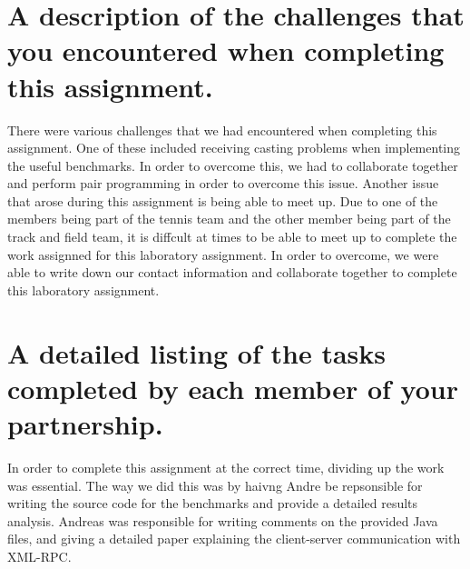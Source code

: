 \documentclass{article}
\begin{document}
\section{A description of the challenges that you encountered when completing this assignment.}

There were various challenges that we had encountered when completing this assignment. One of these included receiving casting problems when implementing the useful benchmarks. In order to overcome this, we had to collaborate together and perform pair programming in order to overcome this issue. Another issue that arose during this assignment is being able to meet up. Due to one of the members being part of the tennis team and the other member being part of the track and field team, it is diffcult at times to be able to meet up to complete the work assignned for this laboratory assignment. In order to overcome, we were able to write down our contact information and collaborate together to complete this laboratory assignment. 

\section{A detailed listing of the tasks completed by each member of your partnership.}
In order to complete this assignment at the correct time, dividing up the work was essential. The way we did this was by haivng Andre be repsonsible for writing the source code for the benchmarks and provide a detailed results analysis. Andreas was responsible for writing comments on the provided Java files, and giving a detailed paper explaining the client-server communication with XML-RPC.



\nocite{tanenbaum_steen_2007}





\end{document}
